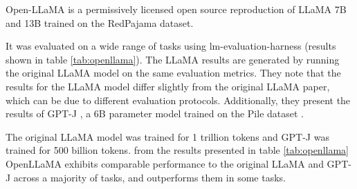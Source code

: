 \documentclass[a4paper,12pt]{article}
\begin{document}
Open-LLaMA is a permissively licensed open source reproduction of LLaMA \cite{llama} 7B and 13B trained on the RedPajama \cite{redpajama} dataset. 

It was evaluated on a wide range of tasks using lm-evaluation-harness \cite{eval-harness} (results shown in table \ref*{tab:openllama}). 
The LLaMA \cite{llama} results are generated by running the original LLaMA model on the same evaluation metrics. 
They note that the results for the LLaMA model differ slightly from the original LLaMA paper, which can be due to different evaluation protocols. 
Additionally, they present the results of GPT-J \cite{gptj}, a 6B parameter model trained on the Pile dataset \cite{pile}.

The original LLaMA model was trained for 1 trillion tokens and GPT-J was trained for 500 billion tokens. from the results presented in table \ref*{tab:openllama} 
OpenLLaMA exhibits comparable performance to the original LLaMA \cite{llama} and GPT-J \cite{gptj} across a majority of tasks, and outperforms them in some tasks.
\end{document}
